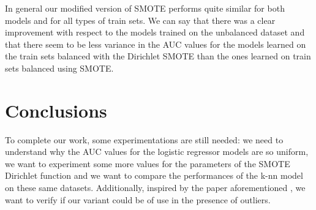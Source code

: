 \documentclass{article}
\begin{document}
In general our modified version of SMOTE performs quite similar for both models and for all types of train sets.
We can say that there was a clear improvement with respect to the models trained on the unbalanced dataset and that there seem to be less variance in the AUC values for the models learned on the train sets balanced with the Dirichlet SMOTE than the ones learned on train sets balanced using SMOTE.

\section{Conclusions}
\label{sec:conclusions}
To complete our work, some experimentations are still needed: we need to understand why the AUC values for the logistic regressor models are so uniform, we want to experiment some more values for the parameters of the SMOTE Dirichlet function and we want to compare the performances of the k-nn model on these same datasets. Additionally, inspired by the paper aforementioned \cite{matharaarachchi2024enhancing}, we want to verify if our variant could be of use in the presence of outliers.



\end{document}
